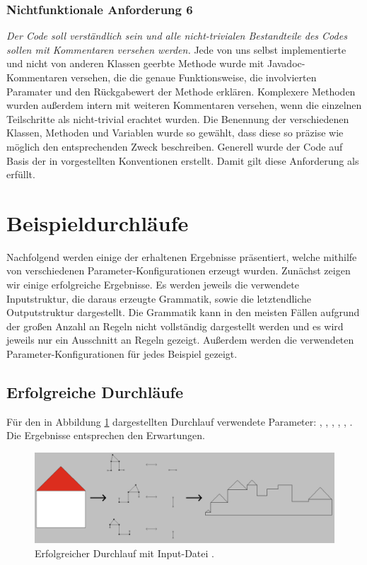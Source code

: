 \subsubsection{Nichtfunktionale Anforderung 6}
\textit{Der Code soll verständlich sein und alle nicht-trivialen Bestandteile des Codes sollen mit Kommentaren versehen werden.} Jede von uns selbst
implementierte und nicht von anderen Klassen geerbte Methode wurde mit Javadoc-Kommentaren versehen, die die genaue Funktionsweise, die involvierten
Paramater und den Rückgabewert der Methode erklären. Komplexere Methoden wurden außerdem intern mit weiteren Kommentaren versehen, wenn die einzelnen
Teilschritte als nicht-trivial erachtet wurden. Die Benennung der verschiedenen Klassen, Methoden und Variablen wurde so gewählt, dass diese so präzise
wie möglich den entsprechenden Zweck beschreiben. Generell wurde der Code auf Basis der in \cite{49_java_conventions} vorgestellten Konventionen erstellt.
Damit gilt diese Anforderung als erfüllt.

\section{Beispieldurchläufe}
Nachfolgend werden einige der erhaltenen Ergebnisse präsentiert, welche mithilfe von verschiedenen Parameter-Konfigurationen erzeugt wurden. Zunächst
zeigen wir einige erfolgreiche Ergebnisse. Es werden jeweils die verwendete Inputstruktur, die daraus erzeugte Grammatik, sowie die letztendliche Outputstruktur
dargestellt. Die Grammatik kann in den meisten Fällen aufgrund der großen Anzahl an Regeln nicht vollständig dargestellt werden und es wird jeweils nur ein
Ausschnitt an Regeln gezeigt. Außerdem werden die verwendeten Parameter-Konfigurationen für jedes Beispiel gezeigt.

\subsection{Erfolgreiche Durchläufe}

Für den in Abbildung \ref{fig:house_success} dargestellten Durchlauf verwendete Parameter: , , ,
, , . Die Ergebnisse entsprechen den Erwartungen.
\begin{figure}[H]
    \centering
    \includegraphics[width=\textwidth]{images/house_success.png}
    \caption{Erfolgreicher Durchlauf mit Input-Datei .}
    \label{fig:house_success}
\end{figure}

